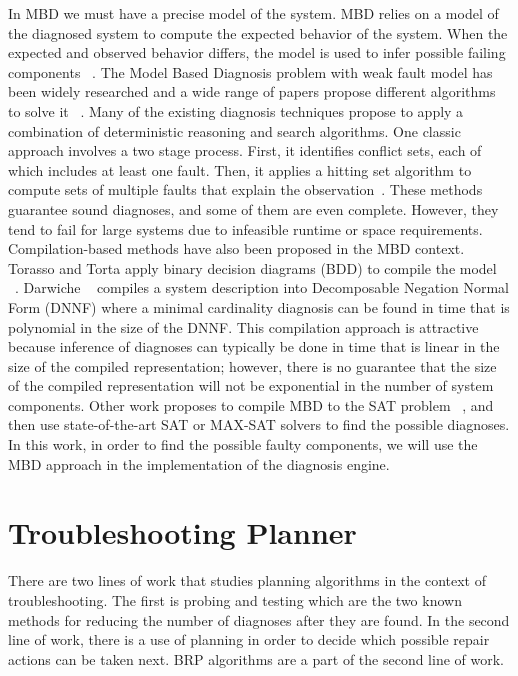 \documentclass[a4paper,11pt]{report}
\begin{document}
In MBD we must have a precise model of the system. MBD relies on a model of the diagnosed system to compute the expected behavior of the system. When the expected and observed behavior differs, the model is used to infer possible failing components ~\cite{reiter1987theory}.
The Model Based Diagnosis problem with weak fault model has been widely researched and a wide range of papers propose different algorithms to solve it ~\cite{reiter1987theory,de1987diagnosing,williams2007conflict,feldman2010approximate,siddiqi2007hierarchical}.%
Many of the existing diagnosis techniques propose to apply a combination of deterministic reasoning and search algorithms. One classic approach involves a two stage process. First, it identifies conflict sets, each of which includes at least one fault. Then, it applies a hitting set algorithm to compute sets of multiple faults that explain the observation~\cite{de1987diagnosing,williams2007conflict}. These methods guarantee sound diagnoses, and some of them are even complete. However, they tend to fail for large systems due to infeasible runtime or space requirements.
Compilation-based methods have also been proposed in the MBD context. Torasso and Torta apply binary decision diagrams (BDD) to compile the model ~\cite{torasso2006model}. Darwiche ~\cite{darwiche2001decomposable} compiles a system description into Decomposable Negation Normal Form (DNNF) where a minimal cardinality diagnosis can be found in time that is polynomial in the size of the DNNF. This compilation approach is attractive because inference of diagnoses can typically be done in time that is linear in the size of the compiled representation; however, there is no guarantee that the size of the compiled representation will not be exponential in the number of system components. Other work proposes to compile MBD to the SAT problem ~\cite{metodi2012compiling}, and then use state-of-the-art SAT or MAX-SAT solvers to find the possible diagnoses. 
In this work, in order to find the possible faulty components, we will use the MBD approach in the implementation of the diagnosis engine.  

\section{Troubleshooting Planner}
There are two lines of work that studies planning algorithms in the context of troubleshooting. The first is probing and testing which are the two known methods for reducing the number of diagnoses after they are found. In the second line of work, there is a use of planning in order to decide which possible repair actions can be taken next. BRP algorithms are a part of the second line of work. 
\end{document}
